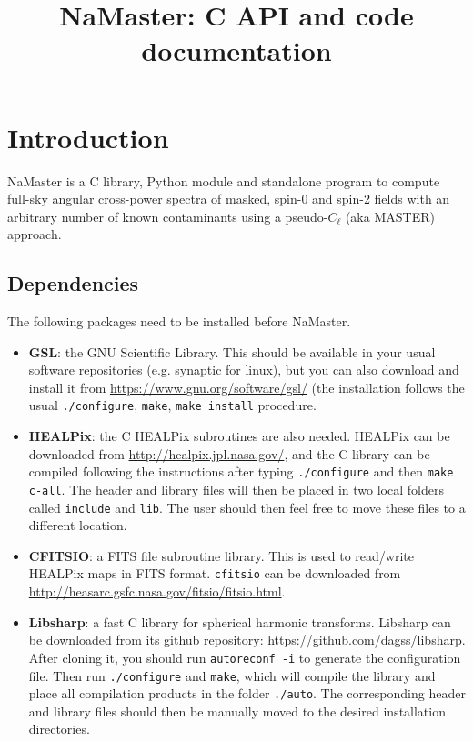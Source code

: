 \documentclass[a4paper,10pt]{article}
\title{NaMaster: C API and code documentation}
\begin{document}
\maketitle
\noindent\makebox[\linewidth]{\rule{\textwidth}{1pt}}
\tableofcontents
\noindent\makebox[\linewidth]{\rule{\textwidth}{1pt}}

\section{Introduction}

NaMaster is a C library, Python module and standalone program to compute full-sky angular cross-power spectra of masked, spin-0 and spin-2 fields with an arbitrary number of known contaminants using a pseudo-$C_\ell$ (aka MASTER) approach.

\subsection{Dependencies}
The following packages need to be installed before NaMaster.
\begin{itemize}
  \item {\bf GSL}: the GNU Scientific Library. This should be available in your usual software repositories (e.g. synaptic for linux), but you can also download and install it from \url{https://www.gnu.org/software/gsl/} (the installation follows the usual {\tt ./configure}, {\tt make}, {\tt make install} procedure.
  \item {\bf HEALPix}: the C HEALPix subroutines are also needed. HEALPix can be downloaded from \url{http://healpix.jpl.nasa.gov/}, and the C library can be compiled following the instructions after typing {\tt ./configure} and then {\tt make c-all}. The header and library files will then be placed in two local folders called {\tt include} and {\tt lib}. The user should then feel free to move these files to a different location.
  \item {\bf CFITSIO}: a FITS file subroutine library. This is used to read/write HEALPix maps in FITS format. {\tt cfitsio} can be downloaded from \url{http://heasarc.gsfc.nasa.gov/fitsio/fitsio.html}.
  \item {\bf Libsharp}: a fast C library for spherical harmonic transforms. Libsharp can be downloaded from its github repository: \url{https://github.com/dagss/libsharp}. After cloning it, you should run {\tt autoreconf -i} to generate the configuration file. Then run {\tt ./configure} and {\tt make}, which will compile the library and place all compilation products in the folder {\tt ./auto}. The corresponding header and library files should then be manually moved to the desired installation directories.
\end{itemize}
\end{document}
